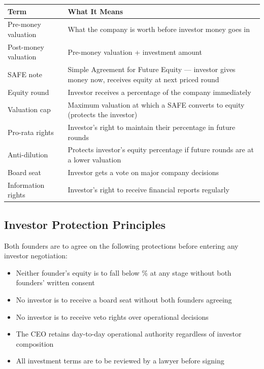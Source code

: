 \documentclass[12pt,a4paper]{article}
\newcommand{\blank}[1][5.5cm]{\underline{\hspace{#1}}}
\begin{document}
\begin{tabularx}{\linewidth}{L{3.5cm} X}
  \toprule
  \textbf{Term} & \textbf{What It Means} \\
  \midrule
  Pre-money valuation   & What the company is worth before investor money goes in \\[0.3em]
  Post-money valuation  & Pre-money valuation + investment amount \\[0.3em]
  SAFE note             & Simple Agreement for Future Equity --- investor gives money now, receives equity at next priced round \\[0.3em]
  Equity round          & Investor receives a percentage of the company immediately \\[0.3em]
  Valuation cap         & Maximum valuation at which a SAFE converts to equity (protects the investor) \\[0.3em]
  Pro-rata rights       & Investor's right to maintain their percentage in future rounds \\[0.3em]
  Anti-dilution         & Protects investor's equity percentage if future rounds are at a lower valuation \\[0.3em]
  Board seat            & Investor gets a vote on major company decisions \\[0.3em]
  Information rights    & Investor's right to receive financial reports regularly \\
  \bottomrule
\end{tabularx}

\subsection{Investor Protection Principles}

Both founders are to agree on the following protections before entering any investor negotiation:

\begin{itemize}
  \item Neither founder's equity is to fall below \blank[2cm]\% at any stage without both founders' written consent
  \item No investor is to receive a board seat without both founders agreeing
  \item No investor is to receive veto rights over operational decisions
  \item The CEO retains day-to-day operational authority regardless of investor composition
  \item All investment terms are to be reviewed by a lawyer before signing
\end{itemize}
\end{document}
